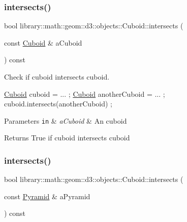 \subsubsection{\texorpdfstring{intersects()}{intersects()}\hspace{0.1cm}{\footnotesize\ttfamily [8/9]}}
{\footnotesize\ttfamily bool library\+::math\+::geom\+::d3\+::objects\+::\+Cuboid\+::intersects (\begin{DoxyParamCaption}\item[{const \hyperlink{classlibrary_1_1math_1_1geom_1_1d3_1_1objects_1_1_cuboid}{Cuboid} \&}]{a\+Cuboid }\end{DoxyParamCaption}) const}



Check if cuboid intersects cuboid. 


\begin{DoxyCode}
\hyperlink{classlibrary_1_1math_1_1geom_1_1d3_1_1objects_1_1_cuboid_ac42299f962fab284a76a46d4ea4e6fa2}{Cuboid} cuboid = ... ;
\hyperlink{classlibrary_1_1math_1_1geom_1_1d3_1_1objects_1_1_cuboid_ac42299f962fab284a76a46d4ea4e6fa2}{Cuboid} anotherCuboid = ... ;
cuboid.intersects(anotherCuboid) ;
\end{DoxyCode}



\begin{DoxyParams}[1]{Parameters}
\mbox{\tt in}  & {\em a\+Cuboid} & An cuboid \\
\hline
\end{DoxyParams}
\begin{DoxyReturn}{Returns}
True if cuboid intersects cuboid 
\end{DoxyReturn}
\mbox{\label{classlibrary_1_1math_1_1geom_1_1d3_1_1objects_1_1_cuboid_ae7861bd5d6f5132271cb4d76de63a5ba}} 
\subsubsection{\texorpdfstring{intersects()}{intersects()}\hspace{0.1cm}{\footnotesize\ttfamily [9/9]}}
{\footnotesize\ttfamily bool library\+::math\+::geom\+::d3\+::objects\+::\+Cuboid\+::intersects (\begin{DoxyParamCaption}\item[{const \hyperlink{classlibrary_1_1math_1_1geom_1_1d3_1_1objects_1_1_pyramid}{Pyramid} \&}]{a\+Pyramid }\end{DoxyParamCaption}) const}



